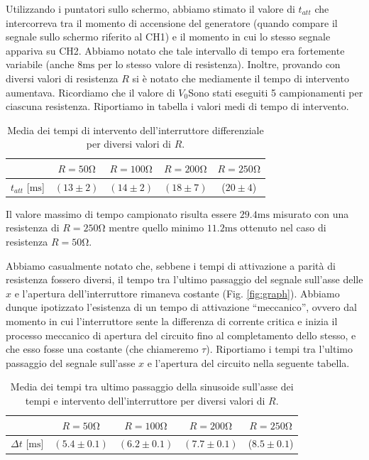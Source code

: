 Utilizzando i puntatori sullo schermo, abbiamo stimato il valore di $t_{att}$ che intercorreva tra il momento di accensione del generatore (quando compare il segnale sullo schermo riferito al CH1) e il momento in cui lo stesso segnale appariva su CH2. Abbiamo notato che tale intervallo di tempo era fortemente variabile (anche $8\si{\milli\second}$ per lo stesso valore di resistenza). Inoltre, provando con diversi valori di resistenza $R$ si è notato che mediamente il tempo di intervento aumentava. Ricordiamo che il valore di $V_0 $Sono stati eseguiti 5 campionamenti per ciascuna resistenza. Riportiamo in tabella i valori medi di tempo di intervento.

\begin{table}[h]
\centering
\caption{Media dei tempi di intervento dell'interruttore differenziale per diversi valori di $R$.}
{\renewcommand{\arraystretch}{1.6}%
\begin{tabular}{c|c|c|c|c}
 & $R=50 \si{\ohm}$ & $R=100 \si{\ohm}$ & $R=200 \si{\ohm}$ & $R=250 \si{\ohm}$ \\      \hline
$t_{att}$ [$\si{\milli\second}$] & $(13 \pm 2)$ & $(14 \pm 2)$ & $(18 \pm 7)$ & ($20 \pm 4$) \\\end{tabular}}
\end{table}


Il valore massimo di tempo campionato risulta essere $29.4\si{\milli\second}$ misurato con una resistenza di $R=250 \si{\ohm}$ mentre quello minimo $11.2\si{\milli\second}$ ottenuto nel caso di resistenza $R=50 \si{\ohm}$.

Abbiamo casualmente notato che, sebbene i tempi di attivazione a parità di resistenza fossero diversi, il tempo tra l'ultimo passaggio del segnale sull'asse delle $x$ e l'apertura dell'interruttore rimaneva costante (Fig. \ref{fig:graph}). Abbiamo dunque ipotizzato l'esistenza di un tempo di attivazione ``meccanico'', ovvero dal momento in cui l'interruttore sente la differenza di corrente critica e inizia il processo meccanico di apertura del circuito fino al completamento dello stesso, e che esso fosse una costante (che chiameremo $\tau$).  Riportiamo i tempi tra l'ultimo passaggio del segnale sull'asse $x$ e l'apertura del circuito nella seguente tabella. 

\begin{table}[h]
\centering
\parbox{14 cm}{\caption{Media dei tempi tra ultimo passaggio della sinusoide sull'asse dei tempi e intervento dell'interruttore per diversi valori di $R$.}}
{\renewcommand{\arraystretch}{1.6}%
\begin{tabular}{c|c|c|c|c}
 & $R=50 \si{\ohm}$ & $R=100 \si{\ohm}$ & $R=200 \si{\ohm}$ & $R=250 \si{\ohm}$ \\      \hline
$\Delta t$ [$\si{\milli\second}$] & $(5.4 \pm 0.1)$ & $(6.2 \pm 0.1)$ & $(7.7 \pm 0.1)$ & ($8.5 \pm 0.1$) \\
\end{tabular}}
\end{table}

